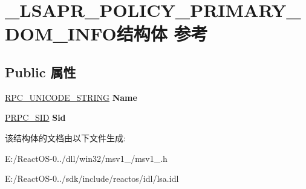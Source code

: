 \hypertarget{struct___l_s_a_p_r___p_o_l_i_c_y___p_r_i_m_a_r_y___d_o_m___i_n_f_o}{}\section{\+\_\+\+L\+S\+A\+P\+R\+\_\+\+P\+O\+L\+I\+C\+Y\+\_\+\+P\+R\+I\+M\+A\+R\+Y\+\_\+\+D\+O\+M\+\_\+\+I\+N\+F\+O结构体 参考}
\label{struct___l_s_a_p_r___p_o_l_i_c_y___p_r_i_m_a_r_y___d_o_m___i_n_f_o}
\subsection*{Public 属性}
\begin{DoxyCompactItemize}
\item 
\mbox{\label{struct___l_s_a_p_r___p_o_l_i_c_y___p_r_i_m_a_r_y___d_o_m___i_n_f_o_a09c0ee0bc23d968a4ba66386160ede37}} 
\hyperlink{struct___r_p_c___u_n_i_c_o_d_e___s_t_r_i_n_g}{R\+P\+C\+\_\+\+U\+N\+I\+C\+O\+D\+E\+\_\+\+S\+T\+R\+I\+NG} {\bfseries Name}
\item 
\mbox{\label{struct___l_s_a_p_r___p_o_l_i_c_y___p_r_i_m_a_r_y___d_o_m___i_n_f_o_a516cfa5da82757d278d9f5a704fb9592}} 
\hyperlink{struct___r_p_c___s_i_d}{P\+R\+P\+C\+\_\+\+S\+ID} {\bfseries Sid}
\end{DoxyCompactItemize}


该结构体的文档由以下文件生成\+:\begin{DoxyCompactItemize}
\item 
E\+:/\+React\+O\+S-\/0../dll/win32/msv1\+\_/msv1\+\_.\+h\item 
E\+:/\+React\+O\+S-\/0../sdk/include/reactos/idl/lsa.\+idl\end{DoxyCompactItemize}
